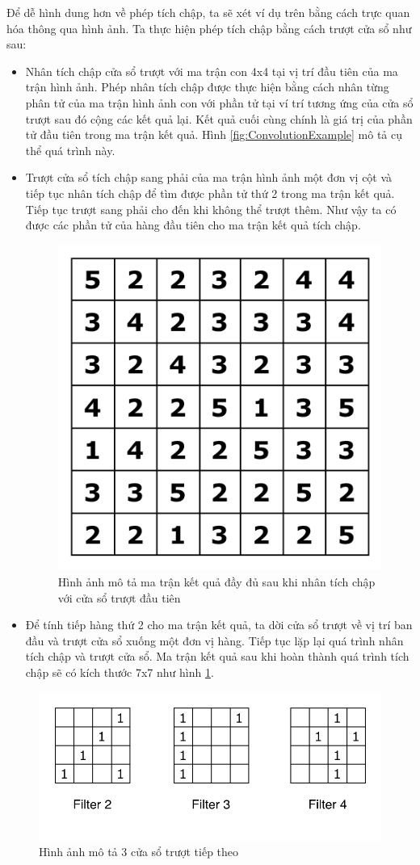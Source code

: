 Để dễ hình dung hơn về phép tích chập, ta sẽ xét ví dụ trên bằng cách trực quan hóa thông qua hình ảnh. Ta thực hiện phép tích chập bằng cách trượt cửa sổ như sau:
\begin{itemize}
\item Nhân tích chập cửa sổ trượt với ma trận con 4x4 tại vị trí đầu tiên của ma trận hình ảnh. Phép nhân tích chập được thực hiện bằng cách nhân từng phân tử của ma trận hình ảnh con với phần tử tại ví trí tương ứng của cửa sổ trượt sau đó cộng các kết quả lại. Kết quả cuối cùng chính là giá trị của phần tử đầu tiên trong ma trận kết quả. Hình \ref{fig:ConvolutionExample} mô tả cụ thể quá trình này.
\item Trượt cửa sổ tích chập sang phải của ma trận hình ảnh một đơn vị cột và tiếp tục nhân tích chập để tìm được phần tử thứ 2 trong ma trận kết quả. Tiếp tục trượt sang phải cho đến khi không thể trượt thêm. Như vậy ta có được các phần tử của hàng đầu tiên cho ma trận kết quả tích chập.

\begin{figure}[!h]
    	\centering
    		\includegraphics[width=0.4\columnwidth]{chapter05/figure/convolution_filter_result_1.png}
    		\centering
    	\caption{Hình ảnh mô tả ma trận kết quả đầy đủ sau khi nhân tích chập với cửa sổ trượt đầu tiên}
    	\label{fig:ConvolutionExampleResult}
    \end{figure}

\item Để tính tiếp hàng thứ 2 cho ma trận kết quả, ta dời cửa sổ trượt về vị trí ban đầu và trượt cửa sổ xuống một đơn vị hàng. Tiếp tục lặp lại quá trình nhân tích chập và trượt cửa sổ. Ma trận kết quả sau khi hoàn thành quá trình tích chập sẽ có kích thước 7x7 như hình \ref{fig:ConvolutionExampleResult}.
\end{itemize}

\begin{figure}[!h]
	\centering
		\includegraphics[width=0.8\columnwidth]{chapter05/figure/convolution_filter_2_3_4.png}
		\centering
	\caption{Hình ảnh mô tả 3 cửa sổ trượt tiếp theo}
	\label{fig:ConvolutionSample234}
\end{figure}

